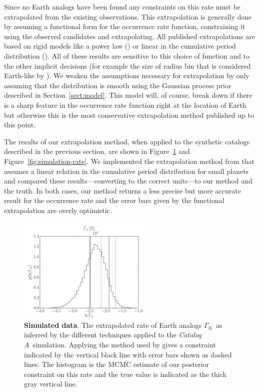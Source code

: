 \documentclass[12pt,preprint]{aastex}
\newcommand{\Fig}[1]{Figure~\ref{fig:#1}}
\newcommand{\fig}[1]{\Fig{#1}}
\newcommand{\figlabel}[1]{\label{fig:#1}}
\newcommand{\Sect}[1]{Section~\ref{sect:#1}}
\newcommand{\sect}[1]{\Sect{#1}}
\newcommand{\rate}{\ensuremath{\Gamma}}
\newcommand{\modela}{\emph{Catalog A}}
\newcommand{\gammaearth}{{\ensuremath{\rate_\oplus}}}
\begin{document}
Since no Earth analogs have been found any constraints on this rate must be
extrapolated from the existing observations.
This extrapolation is generally done by assuming a functional form for the
occurrence rate function, constraining it using the observed candidates and
extrapolating.
All published extrapolations are based on rigid models like a power law
(\citealt{catanzarite, traub}) or linear in the cumulative period distribution
(\citealt{petigura}).
All of these results are sensitive to this choice of function and to the other
implicit decisions (for example the size of radius bin that is considered
Earth-like by \citealt{petigura}).
We weaken the assumptions necessary for extrapolation by only assuming that
the distribution is smooth using the Gaussian process prior described in
\sect{model}.
This model will, of course, break down if there is a sharp feature in the
occurrence rate function right at the location of Earth but otherwise this is
the most conservative extrapolation method published up to this point.

The results of our extrapolation method, when applied to the synthetic
catalogs described in the previous section, are shown in \fig{smooth-rate} and
\fig{simulation-rate}.
We implemented the extrapolation method from \citet{petigura} that assumes a
linear relation in the cumulative period distribution for small planets and
compared these results---converting to the correct units---to our method and
the truth.
In both cases, our method returns a less precise but more accurate result for
the occurrence rate and the error bars given by the functional extrapolation
are overly optimistic.

\begin{figure}[p]
\begin{center}
\includegraphics[width=0.6\textwidth]{figures/smooth/rate.pdf}
\end{center}
\caption{%
{\bf Simulated data}.
The extrapolated rate of Earth analogs \gammaearth\ as inferred by the
different techniques applied to the \modela\ simulation.
Applying the method used by \citet{petigura} gives a constraint indicated by
the vertical black line with error bars shown as dashed lines.
The histogram is the MCMC estimate of our posterior constraint on this rate
and the true value is indicated as the thick gray vertical line.
\figlabel{smooth-rate}}
\end{figure}
\end{document}
